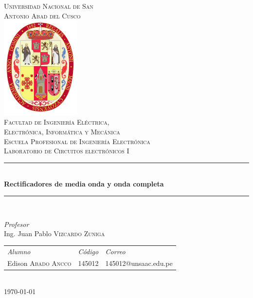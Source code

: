 \documentclass[a4paper]{article} %
\begin{document}

\begin{titlepage}
	\newcommand{\HRule}{\rule{\linewidth}{0.5mm}} 
	\center
	\textsc{\LARGE  Universidad Nacional de San \\[0.2cm] Antonio Abad del Cusco}\\[1.5cm] 
	\includegraphics[width=4cm]{IMAGENES/escudo}\\[1cm]
	\textsc{\Large Facultad de Ingeniería Eléctrica, \\ Electrónica, Informática y Mecánica}\\[0.5cm] 
	\textsc{\large Escuela Profesional de Ingeniería Electrónica}\\[0.5cm]
	\textsc{\Large Laboratorio de Circuitos electrónicos I}\\[0.5cm]
	\HRule \\[0.4cm]
	{ \huge \bfseries Rectificadores de media onda y onda completa}\\[0.4cm] 
	\HRule \\[1.5cm]
	\begin{minipage}{\textwidth}
		\center 
		
		\emph{Profesor} \\
		Ing. Juan Pablo \textsc{Vizcardo Zuniga} \\[1cm]
		
		\begin{tabular}{lll}
			\emph{Alumno} & \emph{Código} & \emph{Correo}\\
			Edison \textsc{Abado Ancco } & 145012 & 145012@unsaac.edu.pe\\
			
		\end{tabular}
	\end{minipage}\\[2cm]
	\today
\end{titlepage}


\end{document}
